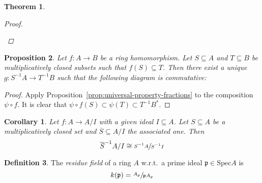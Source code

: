 \documentclass[11pt]{article}
\newtheorem{theorem}{Theorem}[section]
\newtheorem{corollary}{Corollary}[theorem]
\newtheorem{prop}[theorem]{Proposition}
\theoremstyle{definition}
\newtheorem{defn}[theorem]{Definition}
\begin{document}
\begin{theorem}
\begin{proof}
\begin{itemize}
                \end{itemize}

            \end{proof}
        \end{theorem}


        \begin{prop}
            Let $f:A \longrightarrow B$ be a ring homomorphism.
            Let $S \subseteq A$ and $T \subseteq B$ be
            multiplicatively closed subsets such that $f(S) \subseteq T$.
            Then there exist a unique $g: S^{-1}A \longrightarrow T^{-1}B$
            such that the following diagram is commutative:
            \begin{center}
            \end{center}
        \end{prop}
            \begin{proof}

                Apply Proposition~\ref{prop:universal-property-fractions} to the composition $\psi \circ f$.
                It is clear that  $\psi \circ f(S) \subset \psi(T) \subset T^{-1}B^*$.

            \end{proof}

        \begin{corollary}
            Let $f:A \longrightarrow A/I$ with a given ideal $I \subseteq A$.
            Let $S \subseteq A$ be a multiplicatively closed set and $\overline{S} \subseteq A/I$ the associated one.
            Then
            \[
                \overline{S}^{-1}A/I \cong \sfrac{S^{-1}A}{S^{-1}I}  %
            \]
        \end{corollary}

        \begin{defn}
            The \emph{residue field} of a ring $A$ w.r.t.\ a prime ideal $\mathfrak{p} \in\text{Spec}A$ is
            \[
                k(\mathfrak{p}) = \sfrac{A_{\mathfrak{p}}}{\mathfrak{p}A_{\mathfrak{p}}}
            \]
        \end{defn}
\end{document}
